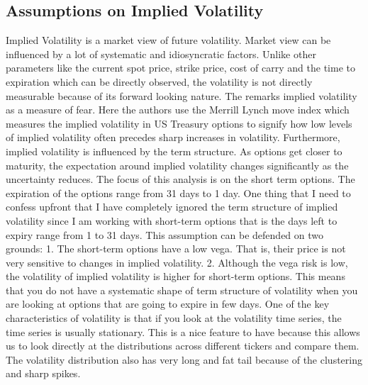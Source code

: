 \subsection{Assumptions on Implied Volatility}
Implied Volatility is a market view of future volatility. Market view can be influenced by a lot of systematic and idiosyncratic factors. Unlike other parameters like the current spot price, strike price, cost of carry and the time to expiration which can be directly observed, the volatility is not directly measurable because of its forward looking nature. The \cite{RateLab2008} remarks implied volatility as a measure of fear. Here the authors use the Merrill Lynch move index which measures the implied volatility in US Treasury options to signify how low levels of implied volatility often precedes sharp increases in volatility. Furthermore, implied volatility is influenced by the term structure. As options get closer to maturity, the expectation around implied volatility changes significantly as the uncertainty reduces. The focus of this analysis is on the short term options. The expiration of the options range from 31 days to 1 day. 
One thing that I need to confess upfront that I have completely ignored the term structure of implied volatility since I am working with short-term options that is the days left to expiry range from 1 to 31 days. This assumption can be defended on two grounds:
1. The short-term options have a low vega. That is, their price is not very sensitive to changes in implied volatility.    
2. Although the vega risk is low, the volatility of implied volatility is higher for short-term options. This means that you do not have a systematic shape of term structure of volatility when you are looking at options that are going to expire in few days.    
One of the key characteristics of volatility is that if you look at the volatility time series, the time series is usually stationary. This is a nice feature to have because this allows us to look directly at the distributions across different tickers and compare them. The volatility distribution also has very long and fat tail because of the clustering and sharp spikes. 


